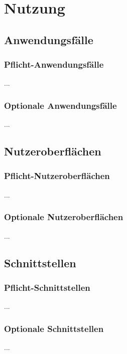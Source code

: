 %
%


\chapter{Nutzung}
\label{Nutzung}



\section{Anwendungsfälle}

\subsection{Pflicht-Anwendungsfälle}

...
\\


\subsection{Optionale Anwendungsfälle}

...
\\


\section{Nutzeroberflächen}

\subsection{Pflicht-Nutzeroberflächen}

...
\\


\subsection{Optionale Nutzeroberflächen}

...
\\


\section{Schnittstellen}

\subsection{Pflicht-Schnittstellen}

...
\\


\subsection{Optionale Schnittstellen}

...
\\


